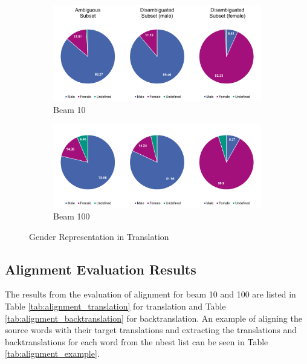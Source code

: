 \begin{figure}[!htb]
     \centering
     
     \begin{subfigure}{\textwidth}
         \centering
         \includegraphics[width=\textwidth]{figures/gender/beam_10.png}
         \caption{Beam 10}
         \label{fig:three sin x}
     \end{subfigure}
     
     \begin{subfigure}{\textwidth}
         \centering
         \includegraphics[width=\textwidth]{figures/gender/beam_100.png}
         \caption{Beam 100}
         \label{fig:five over x}
     \end{subfigure}
     
     
    \caption{Gender Representation in Translation}
    \label{fig:gender_pie_10}
\end{figure}

\subsection{Alignment Evaluation Results}
\label{ch:Base_Experiment:Results:Alignment}

The results from the evaluation of alignment for beam 10 and 100 are listed in Table \ref{tab:alignment_translation} for translation and Table \ref{tab:alignment_backtranslation} for backtranslation. An example of aligning the source words with their target translations and extracting the translations and backtranslations for each word from the nbest list can be seen in Table \ref{tab:alignment_example}.

